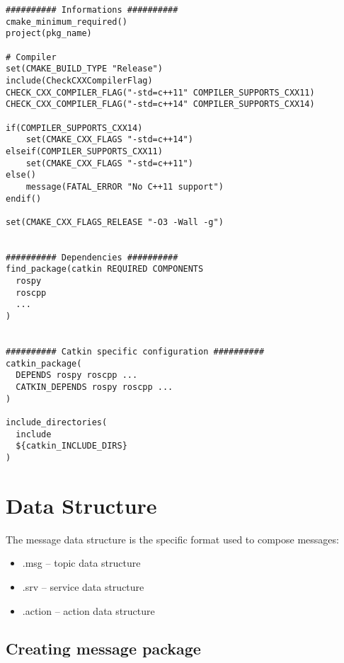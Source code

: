 \begin{verbatim}
########## Informations ##########
cmake_minimum_required()
project(pkg_name)

# Compiler
set(CMAKE_BUILD_TYPE "Release")
include(CheckCXXCompilerFlag)
CHECK_CXX_COMPILER_FLAG("-std=c++11" COMPILER_SUPPORTS_CXX11)
CHECK_CXX_COMPILER_FLAG("-std=c++14" COMPILER_SUPPORTS_CXX14)

if(COMPILER_SUPPORTS_CXX14)
    set(CMAKE_CXX_FLAGS "-std=c++14")
elseif(COMPILER_SUPPORTS_CXX11)
    set(CMAKE_CXX_FLAGS "-std=c++11")
else()
    message(FATAL_ERROR "No C++11 support")
endif()

set(CMAKE_CXX_FLAGS_RELEASE "-O3 -Wall -g")


########## Dependencies ##########
find_package(catkin REQUIRED COMPONENTS 
  rospy
  roscpp
  ...
)


########## Catkin specific configuration ##########
catkin_package(
  DEPENDS rospy roscpp ...
  CATKIN_DEPENDS rospy roscpp ...
)

include_directories(
  include 
  ${catkin_INCLUDE_DIRS}
)

\end{verbatim}






    \section{Data Structure}
    
        The message data structure is the specific format used to compose messages:
        \begin{itemize}
            \item .msg – topic data structure
            \item .srv – service data structure
            \item .action – action data structure
        \end{itemize}
        
        
        \subsection{Creating message package}
        
